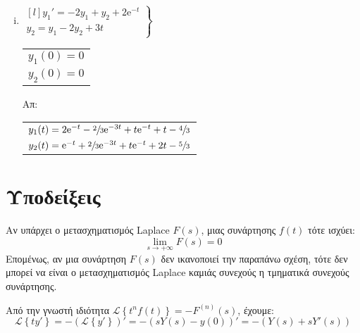 \begin{enumerate}
\begin{enumerate}[i)]
      \item 
        $ 
        \left.
          \begin{matrix*}[l]
            y_{1}' = -2 y_{1}+ y_{2}+ 2 \mathrm{e}^{-t} \\
            y_{2} = y_{1}- 2 y_{2}+3t
          \end{matrix*} 
        \right\} $ \quad {} \quad 
        \begin{tabular}{l}
          $y_{1}(0)=0$ \\
          $y_{2}(0) =0$
        \end{tabular} 
        \hfill Απ: 
        \begin{tabular}{l}
          $ y_{1}(t) = 2 \mathrm{e}^{-t} -\sfrac{2}{3} \mathrm{e}^{-3t} + t \mathrm{e}^{-t} +t
          -\sfrac{4}{3} $
          \\
          $ y_{2}(t) = \mathrm{e}^{-t} + \sfrac{2}{3} \mathrm{e}^{-3t} + t \mathrm{e}^{-t}
          +2t - \sfrac{5}{3} $
        \end{tabular}


    \end{enumerate}
\end{enumerate}

\vspace{\baselineskip}

\section*{Υποδείξεις}

\begin{rem}
  Αν υπάρχει ο μετασχηματισμός Laplace $F(s)$, μιας 
  συνάρτησης $f(t)$ τότε ισχύει:
  \[
    \lim\limits_{s\to+\infty}F(s)=0
  \]
  Επομένως, αν μια συνάρτηση $F(s)$ δεν ικανοποιεί την παραπάνω σχέση, τότε δεν 
  μπορεί να είναι ο μετασχηματισμός Laplace καμιάς συνεχούς η τμηματικά 
  συνεχούς συνάρτησης.
\end{rem}

\begin{rem}
  Από την γνωστή ιδιότητα $ \mathcal{L}\left\{t^{n}f(t)\right\} = - F^{(n)}(s) $, 
  έχουμε:
  \[
    \mathcal{L}\left\{ty'\right\} = - (\mathcal{L}\left\{y'\right\})' = - (sY(s)-y(0))' 
    = -(Y(s)+sY'(s))
  \] 
\end{rem}



